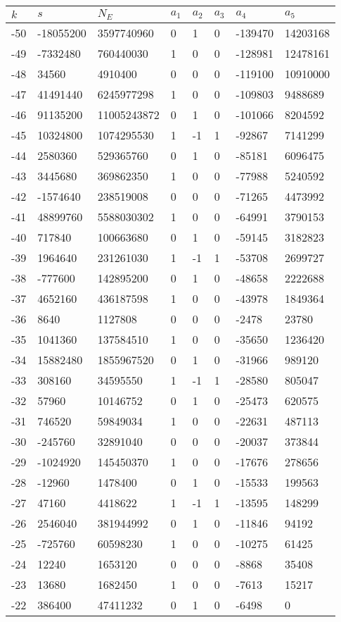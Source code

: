 \documentclass{amsart}
\begin{document}
\begin{longtable}{|l|l|l|lllll|}
\hline
$k$ & $s$ & $N_E$ & $a_1$ & $a_2$ & $a_3$ & $a_4$ & $a_5$\\
\hline
-50&-18055200&3597740960&0&1&0&-139470&14203168\\
-49&-7332480&760440030&1&0&0&-128981&12478161\\
-48&34560&4910400&0&0&0&-119100&10910000\\
-47&41491440&6245977298&1&0&0&-109803&9488689\\
-46&91135200&11005243872&0&1&0&-101066&8204592\\
-45&10324800&1074295530&1&-1&1&-92867&7141299\\
-44&2580360&529365760&0&1&0&-85181&6096475\\
-43&3445680&369862350&1&0&0&-77988&5240592\\
-42&-1574640&238519008&0&0&0&-71265&4473992\\
-41&48899760&5588030302&1&0&0&-64991&3790153\\
-40&717840&100663680&0&1&0&-59145&3182823\\
-39&1964640&231261030&1&-1&1&-53708&2699727\\
-38&-777600&142895200&0&1&0&-48658&2222688\\
-37&4652160&436187598&1&0&0&-43978&1849364\\
-36&8640&1127808&0&0&0&-2478&23780\\
-35&1041360&137584510&1&0&0&-35650&1236420\\
-34&15882480&1855967520&0&1&0&-31966&989120\\
-33&308160&34595550&1&-1&1&-28580&805047\\
-32&57960&10146752&0&1&0&-25473&620575\\
-31&746520&59849034&1&0&0&-22631&487113\\
-30&-245760&32891040&0&0&0&-20037&373844\\
-29&-1024920&145450370&1&0&0&-17676&278656\\
-28&-12960&1478400&0&1&0&-15533&199563\\
-27&47160&4418622&1&-1&1&-13595&148299\\
-26&2546040&381944992&0&1&0&-11846&94192\\
-25&-725760&60598230&1&0&0&-10275&61425\\
-24&12240&1653120&0&0&0&-8868&35408\\
-23&13680&1682450&1&0&0&-7613&15217\\
-22&386400&47411232&0&1&0&-6498&0\\

\end{longtable}
\end{document}
